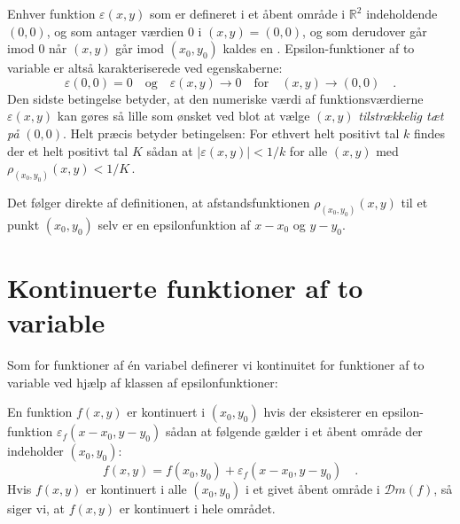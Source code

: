 \begin{definition}
Enhver funktion $\varepsilon(x,y)$ som er defineret i et åbent område i $\mathbb{R}^{2}$ indeholdende $(0,0)$, og som antager værdien $0$ i $(x,y) = (0,0)$, og som derudover går imod $0$ når $(x,y)$ går imod $(x_{0}, y_{0})$ kaldes en . Epsilon-funktioner af to variable er altså karakteriserede ved egenskaberne:
\begin{equation}
\varepsilon(0,0) = 0 \quad  \textrm{og} \quad \varepsilon(x,y) \to 0 \quad \textrm{for} \quad (x,y) \to (0,0) \quad .
\end{equation}
Den sidste betingelse betyder, at den numeriske værdi af funktionsværdierne $\varepsilon(x,y)$ kan gøres så lille som ønsket ved blot at vælge $(x,y)$ \emph{tilstrækkelig tæt på} $(0,0)$. Helt præcis betyder betingelsen: For ethvert helt positivt tal $k$ findes der et helt positivt tal $K$ sådan at $|\varepsilon(x,y)| < 1/k$ for alle $(x,y)$ med $\rho_{(x_{0}, y_{0})}(x,y) < 1/K\,$.
\end{definition}


\begin{aha}
Det følger direkte af definitionen, at afstandsfunktionen $\rho_{(x_{0}, y_{0})}(x,y)$ til et punkt $(x_{0}, y_{0})$ selv er en epsilonfunktion af $x-x_{0}$ og $y-y_{0}$.
\end{aha}


\section{Kontinuerte funktioner af to variable} \label{Epsilon}
Som for funktioner af \'{e}n variabel definerer vi kontinuitet for funktioner af to variable ved hjælp af klassen af epsilonfunktioner:

\begin{definition} \label{defKont2var}
En funktion $f(x,y)$ er kontinuert i $(x_{0}, y_{0})$ hvis der eksisterer en epsilon-funktion $\varepsilon_{f}(x-x_{0}, y-y_{0})$ sådan at følgende gælder i et åbent område der indeholder $(x_{0}, y_{0})$:
\begin{equation}
f(x,y) = f(x_{0}, y_{0}) + \varepsilon_{f}(x-x_{0}, y-y_{0}) \quad.
\end{equation}
Hvis $f(x,y)$ er kontinuert i alle $(x_{0}, y_{0})$ i et givet åbent område i $\mathcal{D}m(f)$, så siger vi, at $f(x,y)$ er kontinuert i hele området.
\end{definition}


